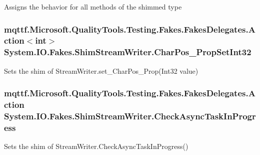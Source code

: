 Assigns the behavior for all methods of the shimmed type

\hypertarget{class_system_1_1_i_o_1_1_fakes_1_1_shim_stream_writer_a9024a9c68a380eb570352e7f9063e7cc}{
\subsubsection[{Char\-Pos\-\_\-\-Prop\-Set\-Int32}]{\setlength{\rightskip}{0pt plus 5cm}mqttf.\-Microsoft.\-Quality\-Tools.\-Testing.\-Fakes.\-Fakes\-Delegates.\-Action$<$int$>$ System.\-I\-O.\-Fakes.\-Shim\-Stream\-Writer.\-Char\-Pos\-\_\-\-Prop\-Set\-Int32\hspace{0.3cm}{\ttfamily [set]}}}\label{class_system_1_1_i_o_1_1_fakes_1_1_shim_stream_writer_a9024a9c68a380eb570352e7f9063e7cc}


Sets the shim of Stream\-Writer.\-set\-\_\-\-Char\-Pos\-\_\-\-Prop(\-Int32 value)

\hypertarget{class_system_1_1_i_o_1_1_fakes_1_1_shim_stream_writer_a68751d2886be9a3c8a45fd4a0ea4ec86}{
\subsubsection[{Check\-Async\-Task\-In\-Progress}]{\setlength{\rightskip}{0pt plus 5cm}mqttf.\-Microsoft.\-Quality\-Tools.\-Testing.\-Fakes.\-Fakes\-Delegates.\-Action System.\-I\-O.\-Fakes.\-Shim\-Stream\-Writer.\-Check\-Async\-Task\-In\-Progress\hspace{0.3cm}{\ttfamily [set]}}}\label{class_system_1_1_i_o_1_1_fakes_1_1_shim_stream_writer_a68751d2886be9a3c8a45fd4a0ea4ec86}


Sets the shim of Stream\-Writer.\-Check\-Async\-Task\-In\-Progress()

